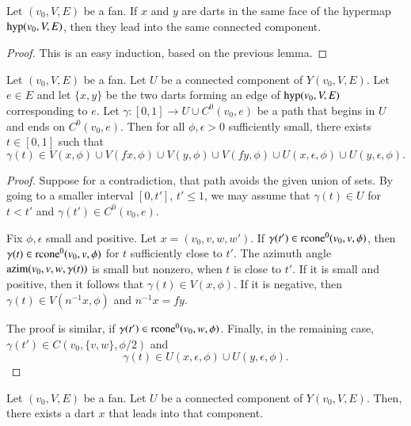 \begin{lemma}\label{lemma:face-component} 
Let $(v_0,V,E)$ be a fan.
If $x$ and $y$ are darts in the same face of the hypermap
${\operatorname{hyp}}(v_0,V,E)$, then they lead into the same connected component.
\end{lemma}

\begin{proof}  This is an easy induction, based on the previous
lemma.  
\end{proof}



\begin{lemma}\label{lemma:approach-Ce}
Let $(v_0,V,E)$ be a fan.  Let $U$ be a connected
component of $Y(v_0,V,E)$.  Let $e\in E$ and let $\{x,y\}$
be the two darts forming an edge of ${\operatorname{hyp}}(v_0,V,E)$
corresponding to $e$.  Let $\gamma:[0,1]\to U\cup C^0(v_0,e)$
be a path that begins in $U$ and ends on $C^0(v_0,e)$.
Then for all $\phi,\epsilon>0$ sufficiently small,
there exists  $t\in[0,1]$ such that
  $$\gamma(t)\in 
  V(x,\phi) \cup 
  V(f x,\phi)\cup 
  V(y,\phi)\cup 
  V(f y,\phi) 
  \cup U(x,\epsilon,\phi)
  \cup U(y,\epsilon,\phi).
  $$
\end{lemma}

\begin{proof}
Suppose for a contradiction, that path avoids the given union
of sets.  By going to a smaller interval $[0,t']$, $t'\le 1$,
we may assume that $\gamma(t)\in U$ for $t < t'$ and $\gamma(t')\in
C^0(v_0,e)$.  

Fix $\phi,\epsilon$ small and positive.
Let $x = (v_0,v,w,w')$.
If $\gamma(t')\in {\operatorname{rcone}}^0(v_0,v,\phi)$, then $\gamma(t)\in
{\operatorname{rcone}}^0(v_0,v,\phi)$ for $t$ sufficiently close to $t'$.  The
azimuth angle ${\operatorname{azim}}(v_0,v,w,\gamma(t))$ is small but nonzero, 
when
$t$ is close to $t'$.  If it is small and positive, then 
it follows that $\gamma(t)\in V(x,\phi)$.  If it is negative, then
$\gamma(t)\in V(n^{-1} x,\phi)$ and $n^{-1} x = f y$.

The proof is similar, if $\gamma(t')\in {\operatorname{rcone}}^0(v_0,w,\phi)$.
Finally, in the remaining case, 
$\gamma(t')\in C(v_0,\{v,w\},\phi/2)$ and 
$$\gamma(t)\in U(x,\epsilon,\phi)\cup U(y,\epsilon,\phi).$$
\end{proof}

\begin{lemma}
Let $(v_0,V,E)$ be a fan.  Let $U$ be a connected
component of $Y(v_0,V,E)$.
Then, there exists a
dart $x$ that leads into that component.
\end{lemma}

